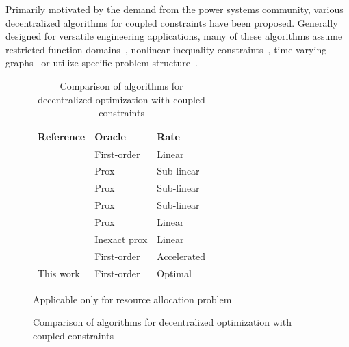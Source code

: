 \documentclass{article}
\begin{document}
Primarily motivated by the demand from the power systems community, various decentralized algorithms for coupled constraints have been proposed. 
Generally designed for versatile engineering applications, many of these algorithms assume restricted function domains~\cite{wang2022distributed,liang2019distributed,nedic2018improved,gong2023decentralized,zhang2021distributed, wu2022distributed}, nonlinear inequality constraints~\cite{liang2019distributed,gong2023decentralized,wu2022distributed}, time-varying graphs~\cite{zhang2021distributed, nedic2018improved} or utilize specific problem structure~\cite{wang2022distributed}.


\begin{figure}
\vspace{-0.93cm}
\begin{minipage}{9cm}
\begin{table}[H]
\centering
\begin{threeparttable}
\caption{Comparison of algorithms for decentralized optimization with coupled constraints}
  \label{tab:main}
  \begin{tabular}{|l|l|l|}
    \hline
    Reference & Oracle & Rate \\ \hline
    \cite{doan2017distributed}~\tnote{$\dagger$} & First-order & Linear\\ \hline
    \cite{falsone2020tracking} & Prox &  Sub-linear\\ \hline
    \cite{wu2022distributed} & Prox &  Sub-linear\\ \hline
    \cite{chang2016proximal}~ & Prox &  Sub-linear\\ \hline
    \cite{li2018accelerated}~\tnote{$\dagger$} & Prox & Linear \\ \hline
    \cite{gong2023decentralized} & Inexact prox & Linear \\ \hline
    \cite{nedic2018improved}~\tnote{$\dagger$} & First-order & Accelerated \\ \hline
    This work & First-order& Optimal \\ \hline
  \end{tabular}
  \begin{tablenotes}
    \footnotesize
    \item[$\dagger$] Applicable only for resource allocation problem
  \end{tablenotes}
\end{threeparttable}
\end{table}
\end{minipage}
\end{figure}
\end{document}
